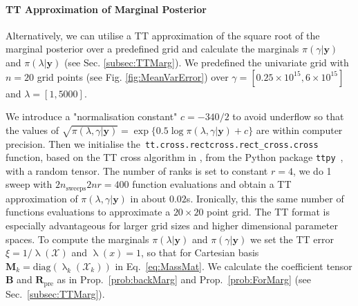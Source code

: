 \paragraph{TT Approximation of Marginal Posterior}
Alternatively, we can utilise a TT approximation of the square root of the marginal posterior over a predefined grid and calculate the marginals $\pi(\gamma|\bm{y})$ and $\pi(\lambda|\bm{y})$ (see Sec. \ref{subsec:TTMarg}).
We predefined the univariate grid with $n = 20$ grid points (see Fig. \ref{fig:MeanVarError}) over $\gamma = [ 0.25 \times 10^{15}, 6 \times 10^{15}]$ and $\lambda = [ 1, 5000]$.

We introduce a "normalisation constant" $c = - 340/2$ to avoid underflow so that the values of $\sqrt{\pi( \lambda,\gamma| \bm{y})} = \exp \{ 0.5 \log  \pi(\lambda,\gamma | \bm{y}) + c \} $ are within computer precision.
Then we initialise the~\texttt{tt.cross.rectcross.rect\_cross.cross} function, based on the TT cross algorithm in \cite{OSELEDETS2010TTCross,Dolgov2018TTCross}, from the Python package \texttt{ttpy}~\cite{Oseledets2018ttpy}, with a random tensor.
The number of ranks is set to constant $r = 4$, we do 1 sweep with $2n_{\text{sweeps}}2nr =400$ function evaluations and obtain a TT approximation of $\pi( \lambda,\gamma| \bm{y})$ in about $0.02$s.
Ironically, this the same number of functions evaluations to approximate a $20 \times 20$ point grid.
The TT format is especially advantageous for larger grid sizes and higher dimensional parameter spaces.
To compute the marginals $\pi(\lambda| \bm{y})$ and $\pi(\gamma| \bm{y})$ we set the TT error $\xi = 1 / \uplambda (\mathcal{X})$ and $\uplambda(x) = 1$, so that for Cartesian basis $\bm{M}_k = \text{diag}(\uplambda_k(\mathcal{X}_k))$ in Eq.~\ref{eq:MassMat}.
We calculate the coefficient tensor $\bm{B}$ and $\bm{R}_{\text{pre}}$ as in Prop.~\ref{prob:backMarg} and Prop.~\ref{prob:ForMarg} (see Sec.~\ref{subsec:TTMarg}).

